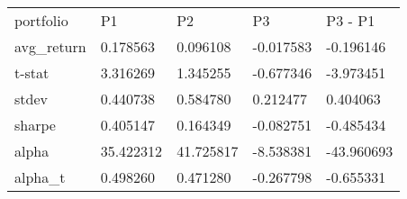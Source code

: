 \begin{tabular}{lllll}
\toprule
\midrule
portfolio & P1 & P2 & P3 & P3 - P1 \\
avg_return & 0.178563 & 0.096108 & -0.017583 & -0.196146 \\
t-stat & 3.316269 & 1.345255 & -0.677346 & -3.973451 \\
stdev & 0.440738 & 0.584780 & 0.212477 & 0.404063 \\
sharpe & 0.405147 & 0.164349 & -0.082751 & -0.485434 \\
alpha & 35.422312 & 41.725817 & -8.538381 & -43.960693 \\
alpha_t & 0.498260 & 0.471280 & -0.267798 & -0.655331 \\
\bottomrule
\end{tabular}
